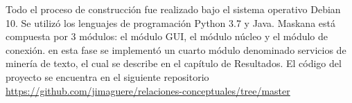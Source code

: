 Todo el proceso de construcción fue realizado bajo el sistema operativo Debian 10. Se utilizó los lenguajes de programación Python 3.7 y Java.
Maskana está compuesta por 3 módulos: el módulo GUI, el módulo núcleo y el módulo de conexión. en esta fase se implementó un cuarto módulo denominado servicios de minería de texto, el cual se describe en el capítulo de Resultados.
El código del proyecto se encuentra en el siguiente repositorio  \textcolor{Cyan}{\underline{\url{https://github.com/jimaguere/relaciones-conceptuales/tree/master}}}


%
%
%
%
%
%
